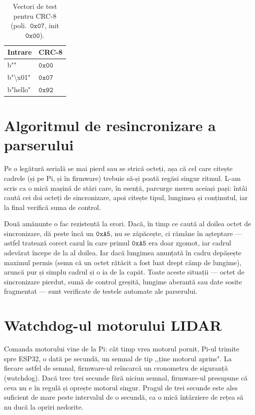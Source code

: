 \documentclass[a4paper,12pt,twoside,openany]{report}
\renewcommand{\texttt}[1]{\textnormal{#1}}
\begin{document}
\begin{table}[H]
\centering
\caption{Vectori de test pentru CRC-8 (poli.\ $\mathtt{0x07}$, init $\mathtt{0x00}$).}
\label{tab:crc-vectors}
\renewcommand{\arraystretch}{1.15}
\begin{tabular}{ll}
\toprule
\textbf{Intrare} & \textbf{CRC-8} \\
\midrule
\texttt{b""}                  & $\mathtt{0x00}$ \\
\texttt{b"\textbackslash x01"} & $\mathtt{0x07}$ \\
\texttt{b"hello"}             & $\mathtt{0x92}$ \\
\bottomrule
\end{tabular}
\end{table}

\section{Algoritmul de resincronizare a parserului}
\label{sec:resync}

Pe o legătură serială se mai pierd sau se strică octeți, așa că cel care
citește cadrele (și pe Pi, și în firmware) trebuie să-și poată regăsi singur
ritmul. L-am scris ca o mică mașină de stări care, în esență, parcurge mereu
aceiași pași: întâi caută cei doi octeți de sincronizare, apoi citește tipul,
lungimea și conținutul, iar la final verifică suma de control.

Două amănunte o fac rezistentă la erori. Dacă, în timp ce caută al doilea
octet de sincronizare, dă peste încă un $\mathtt{0xA5}$, nu se zăpăcește, ci
rămâne în așteptare — astfel tratează corect cazul în care primul $\mathtt{0xA5}$
era doar zgomot, iar cadrul adevărat începe de la al doilea. Iar dacă lungimea
anunțată în cadru depășește maximul permis (semn că un octet rătăcit a fost luat
drept câmp de lungime), aruncă pur și simplu cadrul și o ia de la capăt. Toate
aceste situații — octet de sincronizare pierdut, sumă de control greșită,
lungime aberantă sau date sosite fragmentat — sunt verificate de testele
automate ale parserului.

\section{Watchdog-ul motorului LIDAR}
\label{sec:watchdog}

Comanda motorului vine de la Pi: cât timp vrea motorul pornit, Pi-ul trimite
spre ESP32, o dată pe secundă, un semnal de tip ,,ține motorul aprins". La
fiecare astfel de semnal, firmware-ul reîncarcă un cronometru de siguranță
(watchdog). Dacă trec trei secunde fără niciun semnal, firmware-ul presupune că
ceva nu e în regulă și oprește motorul singur. Pragul de trei secunde este
ales suficient de mare peste intervalul de o secundă, ca o mică întârziere de
rețea să nu ducă la opriri nedorite.
\end{document}
